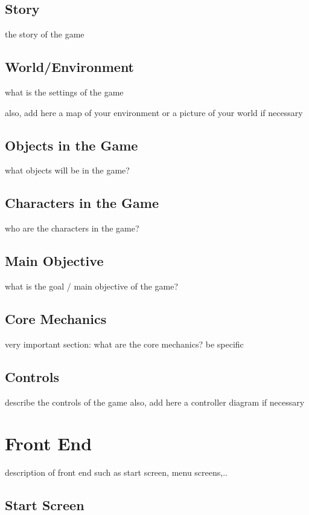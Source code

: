 \documentclass[a4paper]{scrreprt}
\begin{document}
\section{Story}
the story of the game

\section{World/Environment}
what is the settings of the game 

also, add here a map of your environment or a picture of your world if necessary

\section{Objects in the Game}
what objects will be in the game?

\section{Characters in the Game}
who are the characters in the game?

\section{Main Objective}
what is the goal / main objective of the game?

\section{Core Mechanics}
very important section: what are the core mechanics? be specific

\section{Controls}
describe the controls of the game 
also, add here a controller diagram if necessary 



\chapter{Front End}
description of front end such as start screen, menu screens,..  

\section{Start Screen}
\end{document}
